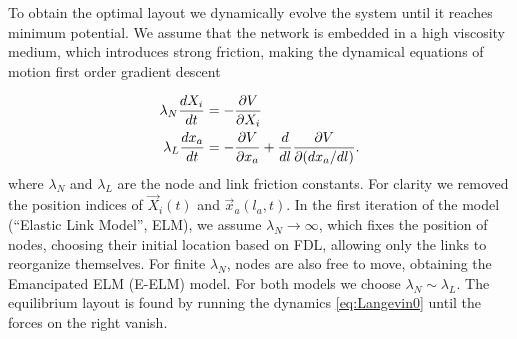 \documentclass[nofootinbib,preprint,floatfix,endfloats]{revtex4} %
\begin{document}

To obtain the optimal layout we dynamically evolve the system until it reaches minimum potential.
We %
assume that the network is embedded in a high viscosity medium, which introduces strong friction, making the dynamical equations of motion first order gradient descent 

\begin{align}
    \lambda_N {dX_i\over dt} &= -{\ro V \over \ro X_i} %
    \label{eq:nodes}\\
    \lambda_L {dx_a \over dt} & =  -{\ro V \over \ro x_a} + {d\over dl} {\ro V \over \ro (dx_a /dl)}   \label{eq:Langevin0}.
\end{align}
where $\lambda_N$ and $\lambda_L$ are the node and link friction constants. 
For clarity we removed the position indices of $\vec{X}_i(t)$ and  $\vec{x}_a(l_a,t)$. 
In the first iteration of the model (``Elastic Link Model'', ELM), we assume $\lambda_N\to \infty$, which fixes the position of nodes, choosing their initial location based on FDL, allowing only the links to  reorganize themselves.  
For finite $\lambda_N$, nodes are also free to move, obtaining the Emancipated ELM (E-ELM) model. For both models we choose
$\lambda_N \sim \lambda_L$. The equilibrium layout is found by %
running the dynamics  \eqref{eq:Langevin0} until the forces on the right %
vanish.
\end{document}

